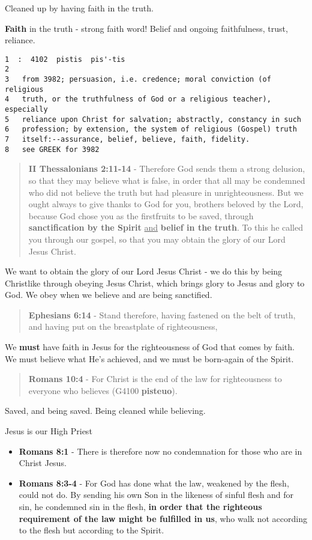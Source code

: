 \documentclass[11pt]{article}
\begin{document}
Cleaned up by having faith in the truth.

\textbf{Faith} in the truth - strong faith word! Belief and ongoing faithfulness, trust, reliance.

\begin{verbatim}
1  :  4102  pistis  pis'-tis
2  
3   from 3982; persuasion, i.e. credence; moral conviction (of religious
4   truth, or the truthfulness of God or a religious teacher), especially
5   reliance upon Christ for salvation; abstractly, constancy in such
6   profession; by extension, the system of religious (Gospel) truth
7   itself:--assurance, belief, believe, faith, fidelity.
8   see GREEK for 3982
\end{verbatim}

\begin{quote}
\textbf{II Thessalonians 2:11-14} - Therefore God sends them a strong delusion, so that they may believe what is false, in order that all may be condemned who did not believe the truth but had pleasure in unrighteousness. But we ought always to give thanks to God for you, brothers beloved by the Lord, because God chose you as the firstfruits to be saved, through \textbf{sanctification by the Spirit} \uline{and} \textbf{belief in the truth}. To this he called you through our gospel, so that you may obtain the glory of our Lord Jesus Christ.
\end{quote}

We want to obtain the glory of our Lord Jesus Christ - we do this by being Christlike through obeying Jesus Christ, which brings glory to Jesus and glory to God. We obey when we believe and are being sanctified.

\begin{quote}
\textbf{Ephesians 6:14} - Stand therefore, having fastened on the belt of truth, and having put on the breastplate of righteousness,
\end{quote}

We \textbf{must} have faith in Jesus for the righteousness of God that comes by faith.
We must believe what He's achieved, and we must be born-again of the Spirit.

\begin{quote}
\textbf{Romans 10:4} - For Christ is the end of the law for righteousness to everyone who believes (G4100 \textbf{pisteuo}).
\end{quote}

Saved, and being saved. Being cleaned while believing.

Jesus is our High Priest
\begin{itemize}
\item \textbf{Romans 8:1} - There is therefore now no condemnation for those who are in Christ Jesus.
\item \textbf{Romans 8:3-4} - For God has done what the law, weakened by the flesh, could not do. By sending his own Son in the likeness of sinful flesh and for sin, he condemned sin in the flesh, \textbf{in order that the righteous requirement of the law might be fulfilled in us}, who walk not according to the flesh but according to the Spirit.
\end{itemize}
\end{document}
